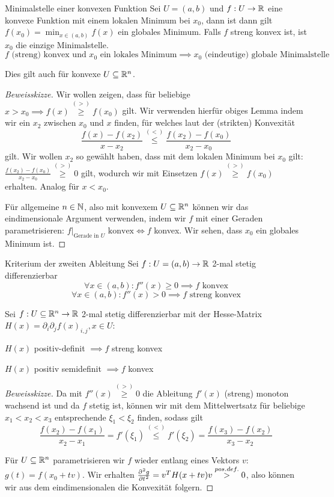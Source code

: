\begin{satz}{Minimalstelle einer konvexen Funktion}{}
Sei $U = (a,b)$ und $f: U \to \mathbb{R}$ eine konvexe Funktion mit einem lokalen Minimum bei $x_0$, dann ist dann gilt $f(x_0) = \min_{x \in (a,b)} f(x)$ ein globales Minimum. Falls $f$ streng konvex ist, ist $x_0$ die einzige Minimalstelle.
$$f \text{ (streng) konvex und } x_0 \text{ ein lokales Minimum} \implies x_0 \text{ (eindeutige) globale Minimalstelle}$$

Dies gilt auch für konvexe $U \subseteq \mathbb{R}^n$.
\end{satz}
\begin{proof}[Beweisskizze]
Wir wollen zeigen, dass für beliebige $x > x_0 \implies f(x) \stackrel{(>)}{\geq} f(x_0)$ gilt. Wir verwenden hierfür obiges Lemma indem wir ein $x_2$ zwischen $x_0$ und $x$ finden, für welches laut der (strikten) Konvexität
$$\frac{f(x)-f(x_2)}{x-x_2}\stackrel{(<)}{\leq}\frac{f(x_2)-f(x_0)}{x_2-x_0}$$
gilt. Wir wollen $x_2$ so gewählt haben, dass mit dem lokalen Minimum bei $x_0$ gilt: $\frac{f(x_2)-f(x_0)}{x_2-x_0} \stackrel{(>)}{\geq} 0$ gilt, wodurch wir mit Einsetzen $f(x) \stackrel{(>)}{\geq} f(x_0)$  erhalten. Analog für $x < x_0$.

Für allgemeine $n \in \mathbb{N} $, also mit konvexem $U \subseteq \mathbb{R}^n$ können wir das eindimensionale Argument verwenden, indem wir $f$ mit einer Geraden parametrisieren: $f\vert_{\text{Gerade in }U} \text{ konvex} \iff f $ konvex. Wir sehen, dass $x_0$ ein globales Minimum ist.
\end{proof}

\begin{satz}{Kriterium der zweiten Ableitung}{}
Sei $f:U = (a,b) \to \mathbb{R}$ 2-mal stetig differenzierbar
$$\forall x\in (a,b) : f''(x) \geq 0 \implies f \text{ konvex}$$
$$\forall x\in (a,b) : f''(x) > 0 \implies f \text{ streng konvex}$$

Sei $f:U \subseteq \mathbb{R}^n \to \mathbb{R}$ 2-mal stetig differenzierbar mit der Hesse-Matrix $H(x) = \partial_i \partial_j f(x)_{i,j}, x \in U$:

 \centering$H(x)$ positiv-definit $\implies f$  streng konvex

\centering$H(x)$ positiv semidefinit $\implies f $ konvex
\end{satz}
\begin{proof}[Beweisskizze]
Da mit $f''(x) \stackrel{(>)}{\geq} 0$ die Ableitung $f'(x)$ (streng) monoton wachsend ist und da $f$ stetig ist, können wir mit dem Mittelwertsatz für beliebige $x_1 < x_2 < x_3$ entsprechende $\xi_1 < \xi_2$ finden, sodass gilt $$\frac{f(x_2)-f(x_1)}{x_2-x_1} = f'(\xi_1) \stackrel{(<)}{\leq} f'(\xi_2) = \frac{f(x_3)-f(x_2)}{x_3-x_2}$$

Für $U \subseteq \mathbb{R}^n$ parametrisieren wir $f$ wieder entlang eines Vektors $v$: $g(t) = f(x_0 + tv)$. Wir erhalten $\diffp[2]{g}{t} = v^TH(x+tv)v \stackrel{pos. def.}{>} 0$, also können wir aus dem eindimensionalen die Konvexität folgern.
\end{proof}
